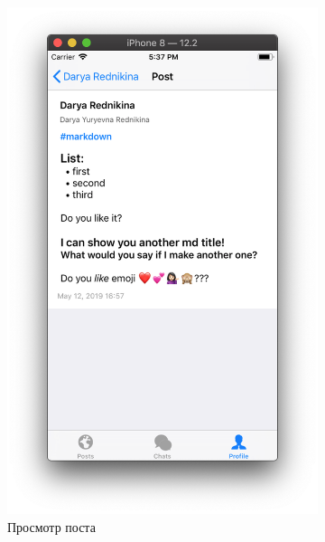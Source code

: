 \documentclass[a4paper,12pt]{article}
\begin{document}
	\begin{figure}[h!]
		\centering
		\begin{subfigure}[b]{0.3\linewidth}
			\includegraphics[width=\linewidth]{../includes/pmi/profile_fullpost.png}
			\caption{\label{sub: fullpost}Просмотр поста}
		\end{subfigure}
		\begin{subfigure}[b]{0.3\linewidth}

\end{subfigure}
\end{figure}
\end{document}
